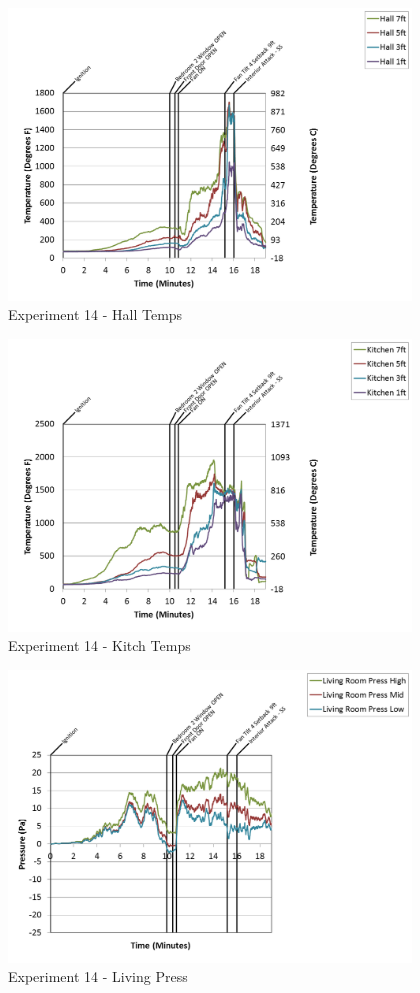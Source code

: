 \documentclass{article}
\begin{document}
\begin{appendices}
\clearpage

\begin{figure}[h!]
	\centering
	\includegraphics[height=3.05in]{0_Images/Results_Charts/Exp_14_Charts/HallTemps.png}
	\caption{Experiment 14 - Hall Temps}
\end{figure}


\begin{figure}[h!]
	\centering
	\includegraphics[height=3.05in]{0_Images/Results_Charts/Exp_14_Charts/KitchTemps.png}
	\caption{Experiment 14 - Kitch Temps}
\end{figure}

\clearpage

\begin{figure}[h!]
	\centering
	\includegraphics[height=3.05in]{0_Images/Results_Charts/Exp_14_Charts/LivingPress.png}
	\caption{Experiment 14 - Living Press}
\end{figure}



\end{appendices}
\end{document}
